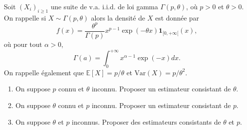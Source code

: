 \smallskip

\begin{mdframed}
\begin{exercice}
Soit $(X_i)_{i \ge 1}$ une suite de v.a. i.i.d. de loi gamma $\Gamma(p, \theta)$, où $p > 0$ et $\theta > 0$. On rappelle si $X \sim \Gamma(p, \theta)$ alors la densité de $X$ est donnée par
\begin{equation*}
f(x) = \frac{\theta^p}{\Gamma(p)} x^{p-1} \exp(-\theta x) \mathbf{1}_{[0,+\infty[}(x),
\end{equation*}
où pour tout $\alpha > 0$,
\begin{equation*}
\Gamma(a) = \int_0^{+\infty} x^{\alpha-1} \exp(-x) dx.
\end{equation*}
On rappelle également que $\mathbb{E}[X] = p/\theta$ et $\text{Var}(X) = p/\theta^2$.

\begin{enumerate}
    \item On suppose $p$ connu et $\theta$ inconnu. Proposer un estimateur consistant de $\theta$.
    \item On suppose $\theta$ connu et $p$ inconnu. Proposer un estimateur consistant de $p$.
    \item On suppose $\theta$ et $p$ inconnus. Proposer des estimateurs consistants de $\theta$ et $p$.
\end{enumerate}
\end{exercice}
\end{mdframed}

\smallskip


